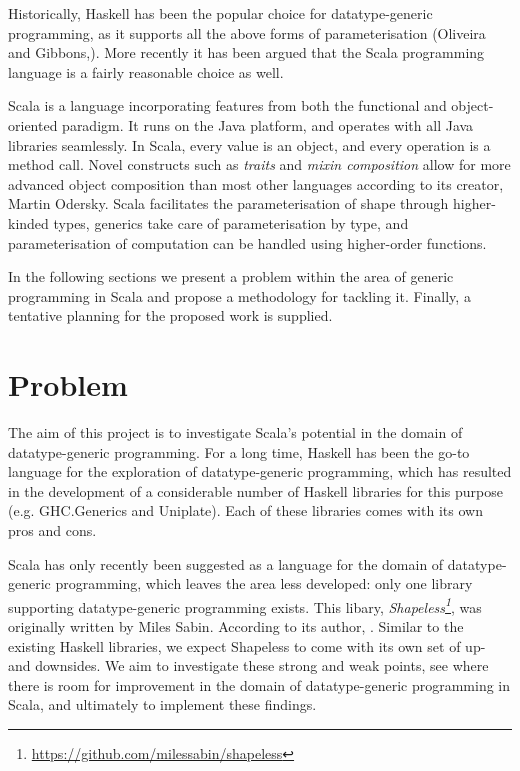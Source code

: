 \documentclass{article}
\begin{document}
Historically, Haskell has been the popular choice for datatype-generic programming, as it supports all the above forms of parameterisation (Oliveira and Gibbons,\cite{Oliveira08scalafor}). More recently it has been argued that the Scala programming language is a fairly reasonable choice as well. 

Scala\cite{odersky2004scala} is a language incorporating features from both the functional and object-oriented paradigm. It runs on the Java platform, and operates with all Java libraries seamlessly. In Scala, every value is an object, and every operation is a method call. Novel constructs such as \emph{traits} and \emph{mixin composition} allow for more advanced object composition than most other languages according to its creator, Martin Odersky\cite{odersky2005scalable}. Scala facilitates the parameterisation of shape through higher-kinded types, generics take care of parameterisation by type, and parameterisation of computation can be handled using higher-order functions\cite{Oliveira08scalafor}. 

In the following sections we present a problem within the area of generic programming in Scala and propose a methodology for tackling it. Finally, a tentative planning for the proposed work is supplied.

\section{Problem}

The aim of this project is to investigate Scala's potential in the domain of datatype-generic programming. For a long time, Haskell has been the go-to language for the exploration of datatype-generic programming\cite{Oliveira08scalafor}, which has resulted in the development of a considerable number of Haskell libraries for this purpose (e.g. GHC.Generics and Uniplate).  Each of these libraries comes with its own pros and cons.

Scala has only recently been suggested as a language for the domain of datatype-generic programming, which leaves the area less developed: only one library supporting datatype-generic programming exists. This libary, \emph{Shapeless\footnote{\url{https://github.com/milessabin/shapeless}}}\cite{shapeless}, was originally written by Miles Sabin. According to its author, . Similar to the existing Haskell libraries, we expect Shapeless to come with its own set of up- and downsides. We aim to investigate these strong and weak points, see where there is room for improvement in the domain of datatype-generic programming in Scala, and ultimately to implement these findings.
\end{document}
